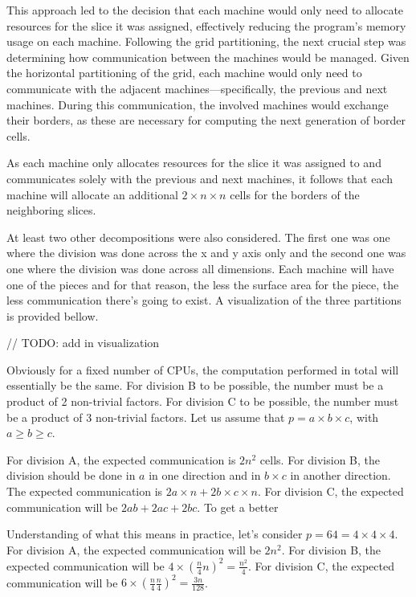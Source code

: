 \documentclass{article}
\begin{document}
This approach led to the decision that each machine would only need to allocate resources for the 
slice it was assigned, effectively reducing the program's memory usage on each machine. Following 
the grid partitioning, the next crucial step was determining how communication between the machines 
would be managed. Given the horizontal partitioning of the grid, each machine would only need to 
communicate with the adjacent machines—specifically, the previous and next machines. During this 
communication, the involved machines would exchange their borders, as these are necessary for 
computing the next generation of border cells.

As each machine only allocates resources for the slice it was assigned to and communicates solely 
with the previous and next machines, it follows that each machine will allocate an additional 
$2 \times n \times n$ cells for the borders of the neighboring slices.

At least two other decompositions were also considered. The first one was one where
the division was done across the x and y axis only and the second one was one where
the division was done across all dimensions. Each machine will have one of the pieces
and for that reason, the less the surface area for the piece, the less communication
there's going to exist. A visualization of the three partitions is provided bellow.

// TODO: add in visualization

Obviously for a fixed number of CPUs, the computation performed in total will essentially
be the same. For division B to be possible, the number must be a product of 2 non-trivial
factors. For division C to be possible, the number must be a product of 3 non-trivial factors.
Let us assume that $p = a \times b \times c$, with $a \ge b \ge c$.

For division A, the expected communication is $2n^2$ cells.
For division B, the division should be done in $a$ in one direction and in $b \times c$
in another direction. The expected communication is $2a \times n + 2b \times c \times n$.
For division C, the expected communication will be $2ab + 2ac + 2bc$. To get a better

Understanding of what this means in practice, let's consider $p=64=4 \times 4 \times 4$.
For division A, the expected communication will be $2n^2$. For division B, the expected
communication will be $4 \times (\frac{n}{4}n)^2 = \frac{n^2}{4}$.
For division C, the expected communication will be $6 \times (\frac{n}{4}\frac{n}{4})^2 = \frac{3n}{128}$.
\end{document}
